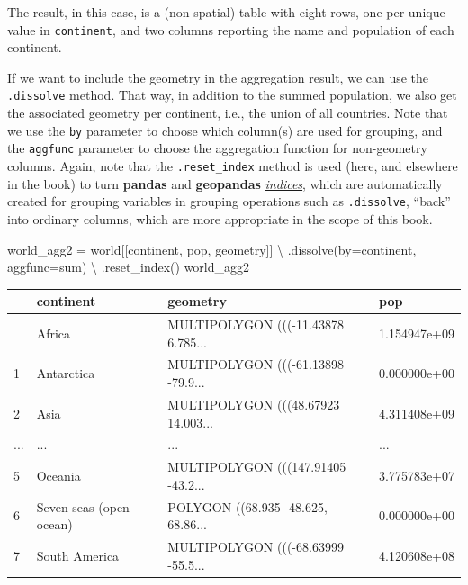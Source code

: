 \documentclass[
  letterpaper,
]{krantz}
\newenvironment{Shaded}{\begin{snugshade}}{\end{snugshade}}
\newcommand{\NormalTok}[1]{\textcolor[rgb]{0.00,0.23,0.31}{#1}}
\newcommand{\OperatorTok}[1]{\textcolor[rgb]{0.37,0.37,0.37}{#1}}
\newcommand{\StringTok}[1]{\textcolor[rgb]{0.13,0.47,0.30}{#1}}
\begin{document}
The result, in this case, is a (non-spatial) table with eight rows, one
per unique value in \texttt{continent}, and two columns reporting the
name and population of each continent.

If we want to include the geometry in the aggregation result, we can use
the \texttt{.dissolve} method. That way, in addition to the summed
population, we also get the associated geometry per continent, i.e., the
union of all countries. Note that we use the \texttt{by} parameter to
choose which column(s) are used for grouping, and the \texttt{aggfunc}
parameter to choose the aggregation function for non-geometry columns.
Again, note that the \texttt{.reset\_index} method is used (here, and
elsewhere in the book) to turn \textbf{pandas} and \textbf{geopandas}
\href{https://pandas.pydata.org/docs/reference/api/pandas.Index.html}{\emph{indices}},
which are automatically created for grouping variables in grouping
operations such as \texttt{.dissolve}, ``back'' into ordinary columns,
which are more appropriate in the scope of this book.

\begin{Shaded}
\begin{Highlighting}[]
\NormalTok{world\_agg2 }\OperatorTok{=}\NormalTok{ world[[}\StringTok{\textquotesingle{}continent\textquotesingle{}}\NormalTok{, }\StringTok{\textquotesingle{}pop\textquotesingle{}}\NormalTok{, }\StringTok{\textquotesingle{}geometry\textquotesingle{}}\NormalTok{]] }\OperatorTok{\textbackslash{}}
\NormalTok{    .dissolve(by}\OperatorTok{=}\StringTok{\textquotesingle{}continent\textquotesingle{}}\NormalTok{, aggfunc}\OperatorTok{=}\StringTok{\textquotesingle{}sum\textquotesingle{}}\NormalTok{) }\OperatorTok{\textbackslash{}}
\NormalTok{    .reset\_index()}
\NormalTok{world\_agg2}
\end{Highlighting}
\end{Shaded}

\begin{longtable}[]{@{}llll@{}}
\toprule\noalign{}
& continent & geometry & pop \\
\midrule\noalign{}
\endhead
\bottomrule\noalign{}
\endlastfoot
0 & Africa & MULTIPOLYGON (((-11.43878 6.785... & 1.154947e+09 \\
1 & Antarctica & MULTIPOLYGON (((-61.13898 -79.9... & 0.000000e+00 \\
2 & Asia & MULTIPOLYGON (((48.67923 14.003... & 4.311408e+09 \\
... & ... & ... & ... \\
5 & Oceania & MULTIPOLYGON (((147.91405 -43.2... & 3.775783e+07 \\
6 & Seven seas (open ocean) & POLYGON ((68.935 -48.625, 68.86... &
0.000000e+00 \\
7 & South America & MULTIPOLYGON (((-68.63999 -55.5... & 4.120608e+08 \\
\end{longtable}
\end{document}

